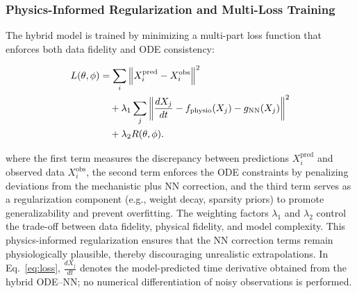 \documentclass[9pt,shortpaper,twoside,web]{ieeecolor}
\begin{document}
\subsubsection{Physics-Informed Regularization and Multi-Loss Training}
The hybrid model is trained by minimizing a multi-part loss function that enforces both data fidelity and ODE consistency:

\begin{align}
L(\theta, \phi) 
&= \sum_{i} \left\| X_i^{\text{pred}} - X_i^{\text{obs}} \right\|^2 \notag \\
&\quad + \lambda_1 \sum_{j} \left\| 
\frac{dX_j}{dt} - f_{\text{physio}}(X_j) - g_{\text{NN}}(X_j) 
\right\|^2 \notag \\
&\quad + \lambda_2 R(\theta, \phi).
\label{eq:loss}
\end{align}


where the first term measures the discrepancy between predictions \(X_i^{\text{pred}}\) and observed data \(X_i^{\text{obs}}\), the second term enforces the ODE constraints by penalizing deviations from the mechanistic plus NN correction, and the third term serves as a regularization component (e.g., weight decay, sparsity priors) to promote generalizability and prevent overfitting. The weighting factors \(\lambda_1\) and \(\lambda_2\) control the trade-off between data fidelity, physical fidelity, and model complexity. This physics-informed regularization ensures that the NN correction terms remain physiologically plausible, thereby discouraging unrealistic extrapolations. In Eq.~\eqref{eq:loss}, $\tfrac{dX_j}{dt}$ denotes the model-predicted time derivative obtained from the hybrid ODE--NN; no numerical differentiation of noisy observations is performed.
\end{document}
